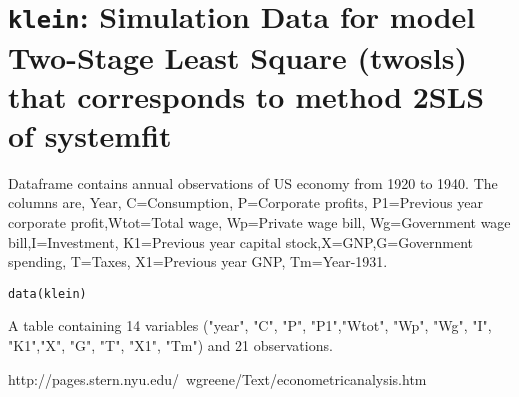  \section{{\tt klein}: Simulation Data for model Two-Stage Least Square (twosls) that corresponds to method 2SLS of systemfit}\label{ss:klein}
\begin{Description}\relax
Dataframe contains annual observations of US economy from 1920 to
1940. The columns are, Year, C=Consumption, P=Corporate profits,
P1=Previous year corporate profit,Wtot=Total wage, Wp=Private wage
bill, Wg=Government wage bill,I=Investment,
K1=Previous year capital stock,X=GNP,G=Government spending, T=Taxes,
X1=Previous year GNP, Tm=Year-1931.
\end{Description}
\begin{Usage}
\begin{verbatim}data(klein)\end{verbatim}
\end{Usage}
\begin{Format}\relax
A table containing 14 variables ("year", "C", "P", "P1","Wtot", "Wp",
"Wg", "I", "K1","X", "G", "T", "X1", "Tm") and 21 observations.
\end{Format}
\begin{Source}\relax
http://pages.stern.nyu.edu/~wgreene/Text/econometricanalysis.htm
\end{Source}



